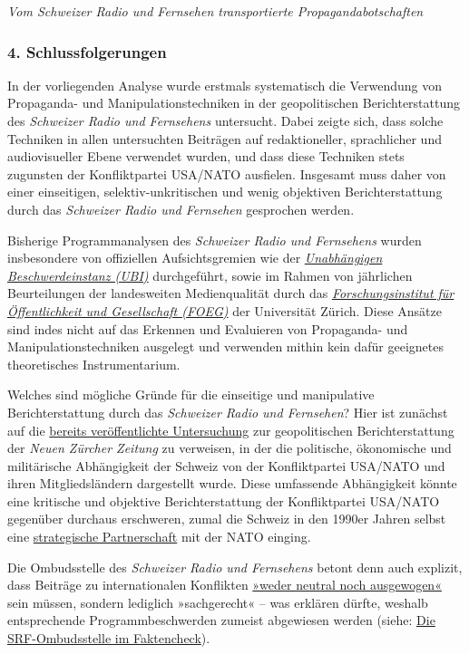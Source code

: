 \emph{Vom Schweizer Radio und Fernsehen transportierte
Propagandabotschaften}

\hypertarget{4-schlussfolgerungen}{%
\subsubsection{4. Schlussfolgerungen}\label{4-schlussfolgerungen}}

In der vorliegenden Analyse wurde erstmals systematisch die Verwendung
von Propaganda- und Manipulationstechniken in der geopolitischen
Berichterstattung des \emph{Schweizer Radio und Fernsehens} untersucht.
Dabei zeigte sich, dass solche Techniken in allen untersuchten Beiträgen
auf redaktioneller, sprachlicher und audiovisueller Ebene verwendet
wurden, und dass diese Techniken stets zugunsten der Konfliktpartei
USA/NATO ausfielen. Insgesamt muss daher von einer einseitigen,
selektiv-unkritischen und wenig objektiven Berichterstattung durch das
\emph{Schweizer Radio und Fernsehen} gesprochen werden.

Bisherige Programmanalysen des \emph{Schweizer Radio und Fernsehens}
wurden insbesondere von offiziellen Aufsichtsgremien wie der
\emph{\href{http://www.ubi.admin.ch/de/}{Unabhängigen Beschwerdeinstanz
(UBI)}} durchgeführt, sowie im Rahmen von jährlichen Beurteilungen der
landesweiten Medienqualität durch das
\emph{\href{http://www.foeg.uzh.ch/de/jahrbuch.html}{Forschungs­institut
für Öffentlichkeit und Gesellschaft (FOEG)}} der Universität Zürich.
Diese Ansätze sind indes nicht auf das Erkennen und Evaluieren von
Propaganda- und Manipulationstechniken ausgelegt und verwenden mithin
kein dafür geeignetes theoretisches Instrumentarium.

Welches sind mögliche Gründe für die einseitige und manipulative
Berichterstattung durch das \emph{Schweizer Radio und Fernsehen}? Hier
ist zunächst auf die \href{https://swprs.org/die-nzz-studie/}{bereits
veröffentlichte Untersuchung} zur geopolitischen Berichterstattung der
\emph{Neuen Zürcher Zeitung} zu verweisen, in der die politische,
ökonomische und militärische Abhängigkeit der Schweiz von der
Konfliktpartei USA/NATO und ihren Mitgliedsländern dargestellt wurde.
Diese umfassende Abhängigkeit könnte eine kritische und objektive
Berichterstattung der Konfliktpartei USA/NATO gegenüber durchaus
erschweren, zumal die Schweiz in den 1990er Jahren selbst eine
\href{https://swprs.org/nato-partnerschaft-medien/}{strategische
Partnerschaft} mit der NATO einging.

Die Ombudsstelle des \emph{Schweizer Radio und Fernsehens} betont denn
auch explizit, dass Beiträge zu internationalen Konflikten
\href{https://swprs.org/srf-ombudsstelle-im-faktencheck/}{»weder neutral
noch ausgewogen«} sein müssen, sondern lediglich »sachgerecht« -- was
erklären dürfte, weshalb entsprechende Programmbeschwerden zumeist
abgewiesen werden (siehe:
\href{https://swprs.org/srf-ombudsstelle-im-faktencheck/}{Die
SRF-Ombudsstelle im Faktencheck}).

